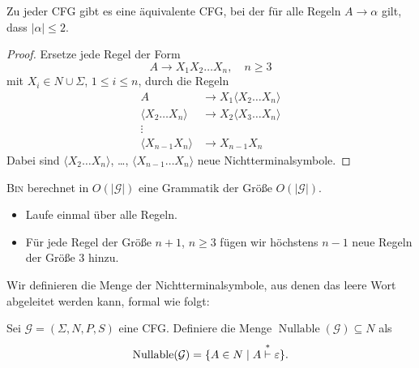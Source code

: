 \begin{lemma}
  Zu jeder \ac{CFG} gibt es eine äquivalente \ac{CFG}, bei der für alle Regeln $A \to \alpha$ gilt, dass $|\alpha| \le 2$.
\end{lemma}
\begin{proof}
  Ersetze jede Regel der Form 
  \begin{displaymath}
    A \to X_1X_2\ldots X_n, \quad n\geq 3
  \end{displaymath}
  mit $X_i \in N \cup \Sigma$, $1 \le i \le n$,
  durch die Regeln 
  \begin{align*}
    A &\to X_1\langle  X_2\ldots X_n \rangle \\
    \langle  X_2\ldots X_n \rangle & \to X_2\langle  X_3\ldots X_n \rangle \\
    \vdots \\
    \langle  X_{n-1}X_n \rangle & \to X_{n-1}X_n
  \end{align*}
  Dabei sind  $\langle  X_2\ldots X_n \rangle$, \ldots, $\langle  X_{n-1}\ldots X_n \rangle$ neue Nichtterminalsymbole.
\end{proof}
\begin{Bemerkung}
\textsc{Bin} berechnet in $O(|\mathcal{G}|)$ eine Grammatik der Größe $O(|\mathcal{G}|)$.
\begin{itemize}
	\item Laufe einmal über alle Regeln.
	
	\item Für jede Regel der Größe $n+1$, $n\geq 3$ fügen wir höchstens $n-1$ neue Regeln der Größe 3 hinzu.
	\qedhere
\end{itemize}
\end{Bemerkung}


Wir definieren die Menge der Nichtterminalsymbole, aus denen das leere Wort abgeleitet werden kann, formal wie folgt:
\begin{Def}
  Sei $\mathcal{G} = (\Sigma, N, P, S)$ eine \ac{CFG}.
  Definiere die Menge $\operatorname{Nullable}(\mathcal{G}) \subseteq N$ als
  \begin{displaymath}
    \operatorname{Nullable}(\mathcal{G}) = \{ A \in N \mid A
    \stackrel{*}{\vdash} \varepsilon \}
    \text{.} \qedhere
  \end{displaymath}
\end{Def}

